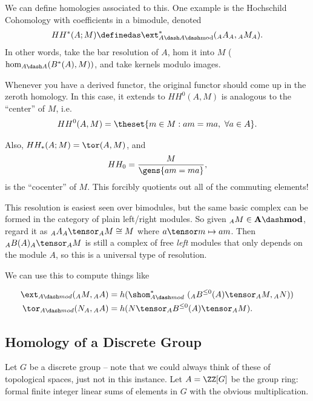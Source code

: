 We can define homologies associated to this. One example is the
Hochschild Cohomology with coefficients in a bimodule, denoted
\begin{align*}
HH^*(A;M) \definedas \ext_{A\dash A\dash\text{mod}}^*({}_A A_A, {}_A M_A)
.\end{align*} In other words, take the bar resolution of \(A\), hom it
into \(M\) (\(\hom_{A\dash A}(B^*(A), M))\), and take kernels modulo
images.

Whenever you have a derived functor, the original functor should come up
in the zeroth homology. In this case, it extends to \(HH^0(A, M)\) is
analogous to the ``center'' of \(M\), i.e.~
\begin{align*}
HH^0(A, M) = \theset{m\in M: am = ma, ~\forall a\in A}
.\end{align*}

Also, \(HH_*(A; M) = \tor(A, M)\), and
\begin{align*}
HH_0 = \frac{M}{\gens{am=ma}}
,\end{align*} is the ``cocenter'' of \(M\). This forcibly quotients out
all of the commuting elements!

This resolution is easiest seen over bimodules, but the same basic
complex can be formed in the category of plain left/right modules. So
given \({}_A M \in \mathbf{A\dash mod}\), regard it as
\({}_A A_A \tensor_A M \cong M\) where \(a\tensor m \mapsto am\). Then
\({}_A B(A)_A \tensor_A M\) is still a complex of free \emph{left}
modules that only depends on the module \(A\), so this is a universal
type of resolution.

We can use this to compute things like

\begin{align*}
\ext_{A\dash mod}({}_A M, {}_A A) 
&= h(\shom^*_{A\dash mod}~ ({}_AB^{\leq 0}(A) \tensor_A M, {}_A N)) \\
\tor_{A\dash mod}(N_A, {}_A A) 
&= h(N\tensor_A B^{\leq 0}(A) \tensor_A M)
.\end{align*}

\hypertarget{homology-of-a-discrete-group}{%
\subsection{Homology of a Discrete
Group}\label{homology-of-a-discrete-group}}

Let \(G\) be a discrete group -- note that we could always think of
these of topological spaces, just not in this instance. Let
\(A = \ZZ[G]\) be the group ring: formal finite integer linear sums of
elements in \(G\) with the obvious multiplication.

